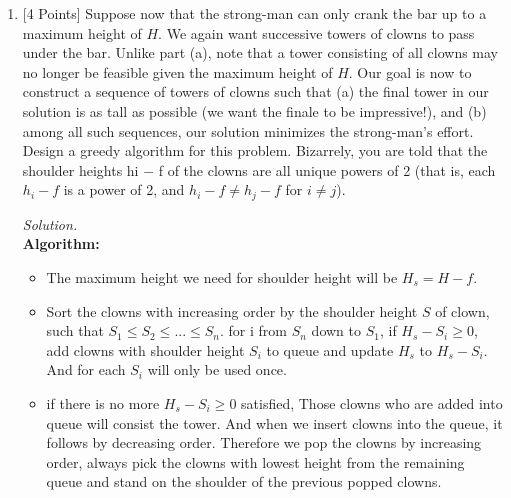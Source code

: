 \documentclass[10pt]{article}
\begin{document}
\begin{enumerate}[label=(\alph*)]
\begin{mdframed}
         
    \end{mdframed}
    \item {[4 Points]} Suppose now that the strong-man can only crank the bar up to a maximum height of $H$. We again want successive towers of clowns to pass under the bar. Unlike part (a), note that a tower consisting of all clowns may no longer be feasible given the maximum height of $H$. Our goal is now to construct a sequence of towers of clowns such that (a) the final tower in our solution is as tall as possible (we want the finale to be impressive!), and (b) among all such sequences, our solution minimizes the strong-man’s effort. Design a greedy algorithm for this problem. Bizarrely, you are told that the shoulder heights hi − f of the clowns are all unique powers of 2 (that is, each $h_i − f$ is a power of 2, and $h_i − f \neq h_j - f$ for $i \neq j$).
    \begin{mdframed}
        \textit{Solution.}\\
        \textbf{Algorithm:}
        \begin{itemize}
            \item The maximum height  we need for shoulder height will be $H_s = H - f$.
            \item Sort the clowns with increasing order by the shoulder height $S$ of clown, such that $S_1 \leq S_2 \leq ... \leq S_n$.
            for i from $S_n$ down to $S_1$, if $H_s -S_i \geq 0$, add clowns with shoulder height $S_i$ to queue and update $H_s$ to $H_s-S_i$. And for each $S_i$ will only be used once.
            \item if there is no more $H_s - S_i \geq 0$ satisfied, Those clowns who are added into queue will consist the tower. And when we insert clowns into the queue, it follows by decreasing order. Therefore we pop the clowns by increasing order, always pick the clowns with lowest height from the remaining queue and stand on the shoulder of the previous popped clowns. 
        \end{itemize}
        

\end{mdframed}
\end{enumerate}
\end{document}
